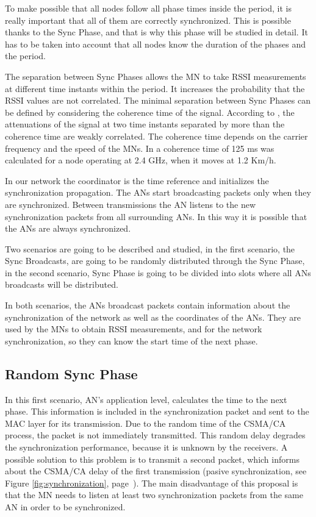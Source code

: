To make possible that all nodes follow all phase times inside the period, it is really important that all of them are correctly synchronized. This is 
possible thanks to the Sync Phase, and that is why this phase will be studied in detail. It has to be taken into account that all nodes know the duration
of the phases and the period.

The separation between Sync Phases allows the \ac{MN} to take \ac{RSSI} measurements at different time instants within the period. It increases the 
probability that the \ac{RSSI} values are not correlated. The minimal separation between Sync Phases can be defined by considering the coherence time 
of the signal.  According to \cite{RSSIcorrelated}, the attenuations of the signal at two time instants separated by more than the coherence time 
are weakly correlated. The coherence time depends on the carrier frequency and the speed of the \acp{MN}. In \cite{RSSIcorrelated2} a coherence time 
of 125 ms was calculated for a node operating at 2.4 GHz, when it moves at 1.2 Km/h.

In our network the coordinator is the time reference and initializes the synchronization propagation. The \acp{AN} start broadcasting packets only 
when they are synchronized. Between transmissions the \ac{AN} listens to the new synchronization packets from all surrounding \acp{AN}. In this way 
it is possible that the \acp{AN} are always synchronized.

Two scenarios are going to be described and studied, in the first scenario, the Sync Broadcasts, are going to be randomly distributed through the Sync 
Phase, in the second scenario, Sync Phase is going to be divided into slots where all \acp{AN} broadcasts will be distributed.

In both scenarios, the \acp{AN} broadcast packets contain information about the synchronization of the network as well as the coordinates 
of the \acp{AN}. They are used by the \acp{MN} to obtain \ac{RSSI} measurements, and for the network synchronization, so they can know the start time of 
the next phase.

\subsection{Random Sync Phase}

In this first scenario, \ac{AN}'s application level, calculates the time to the next phase. This information is included in the synchronization packet 
and sent to the \ac{MAC} layer for its transmission. Due to the random time of the \ac{CSMA/CA} process, the packet is not immediately transmitted. This 
random delay degrades the synchronization performance, because it is unknown by the receivers. A possible solution to this problem is to transmit a 
second packet, which informs about the \ac{CSMA/CA} delay of the first transmission (pasive synchronization, see Figure \ref{fig:synchronization}, 
page~\pageref{fig:synchronization}). The main disadvantage of this proposal is that the \ac{MN} needs to listen at least two synchronization packets 
from the same \ac{AN} in order to be synchronized.

